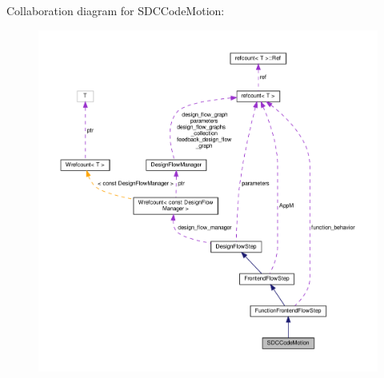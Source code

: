 Collaboration diagram for S\+D\+C\+Code\+Motion\+:
\nopagebreak
\begin{figure}[H]
\begin{center}
\leavevmode
\includegraphics[width=350pt]{de/d14/classSDCCodeMotion__coll__graph}
\end{center}
\end{figure}
